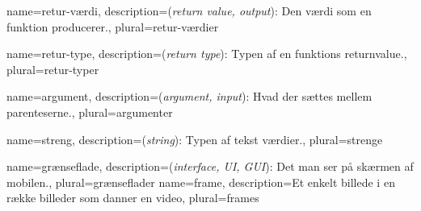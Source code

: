 \usepackage[toc]{glossaries}

\makeglossaries

{
	name={retur-værdi},
	description={(\textit{return value, output}): Den værdi som en funktion 
				 producerer.},
	plural={retur-værdier}
}

{
	name={retur-type},
	description={(\textit{return type}): Typen af en funktions 
				 \gls{returnvalue}.},
	plural={retur-typer}
}

{
	name={argument},
	description={(\textit{argument, input}): Hvad der sættes mellem 
				 parenteserne.},
	plural={argumenter}
}

{
	name={streng},
	description={(\textit{string}): Typen af tekst værdier.},
	plural={strenge}
}

{
	name={grænseflade},
	description={(\textit{interface, UI, GUI}): Det man ser på skærmen af
		 		 mobilen.},
	plural={grænseflader}
}
{
	name={frame},
	description={Et enkelt billede i en række billeder som danner en video},
	plural={frames}
}
